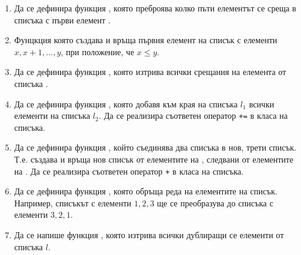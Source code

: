 \begin{enumerate}[resume]

	\item  Да се дефинира функция , която преброява колко пъти елементът  се среща в списъка с първи елемент .
	\item  Фунцкция  която създава и връща първия елемент на списък с елементи $x, x+1, ..., y$, при положение, че $x \leq y$.
	\item  Да се дефинира функция , която изтрива всички срещания на елемента  от списъка .
	\item  Да се дефинира функция , която добавя към края на списъка $l_1$ всички елементи на списъка $l_2$. Да се реализира съответен оператор \texttt{+=} в класа на списъка.
	\item  Да се дефинира функция , който съединява два списъка в нов, трети списък. Т.е.  създава и връща нов списък от елементите на , следвани от елементите на . Да се реализира съответен оператор \texttt{+} в класа на списъка.
	\item  Да се дефинира функция , която обръща реда на елементите на списък. Например, списъкът с елементи $1,2,3$ ще се преобразува до списъка с елементи $3,2,1$.
	\item Да се напише функция , която изтрива всички дублиращи се елементи от списъка $l$.
\end{enumerate}
